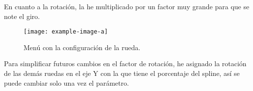 \bigskip

En cuanto a la rotación, la he multiplicado por un factor muy grande para que se note el giro.

\begin{figure}[H]
    \centering
   \texttt{[image: example-image-a]}
   \caption{Menú con la configuración de la rueda.}
\end{figure}

Para simplificar futuros cambios en el factor de rotación, he asignado la rotación de las demás ruedas en el eje Y con la que tiene el porcentaje del spline, así se puede cambiar solo una vez el parámetro.

